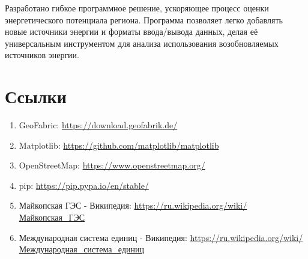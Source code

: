 \documentclass[12pt,a4paper]{scrartcl}
\begin{document}
Разработано гибкое программное решение, ускоряющее процесс оценки энергетического потенциала региона. Программа позволяет легко добавлять новые источники энергии и форматы ввода/вывода данных, делая её универсальным инструментом для анализа использования возобновляемых источников энергии.

\section{Ссылки}
\label{sec:references}

\begin{enumerate}
  \item GeoFabric: \href{https://download.geofabrik.de/}{https://download.geofabrik.de/}
  \item Matplotlib: \href{https://github.com/matplotlib/matplotlib}{https://github.com/matplotlib/matplotlib}
  \item OpenStreetMap: \href{https://www.openstreetmap.org/}{https://www.openstreetmap.org/}
  \item pip: \href{https://pip.pypa.io/en/stable/}{https://pip.pypa.io/en/stable/}
  \item Майкопская ГЭС - Википедия: \href{https://ru.wikipedia.org/wiki/Майкопская\_ГЭС}{https://ru.wikipedia.org/wiki/Майкопская\_ГЭС}
  \item Международная система единиц - Википедия: \href{https://ru.wikipedia.org/wiki/Международная\_система\_единиц}{https://ru.wikipedia.org/wiki/Международная\_система\_единиц}
\end{enumerate}
\end{document}
